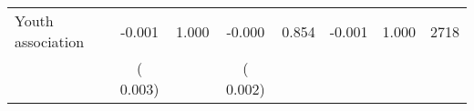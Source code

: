 \begin{tabular}{l*{7}{c}}
 Youth association       &             -0.001       &        1.000  &             -0.000       &        0.854  &             -0.001       &              1.000 &  2718 \\ 
                       &       (       0.003)             &                               &       (       0.002)                     &                               &                                               &                                &                      \\ 

\hline \end{tabular}